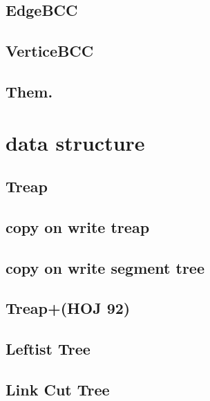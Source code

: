 \documentclass[12pt,twocolumn,oneside]{article}
\begin{document}
\subsection{EdgeBCC}


\subsection{VerticeBCC}


\subsection{Them.}


\section{data structure}
\subsection{Treap}


\subsection{copy on write treap}


\subsection{copy on write segment tree}


\subsection{Treap+(HOJ 92)}


\subsection{Leftist Tree}


\subsection{Link Cut Tree}

\end{document}
